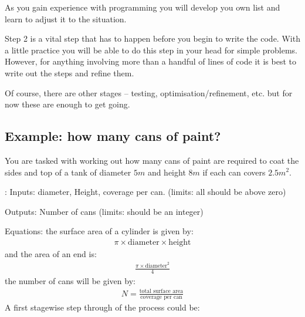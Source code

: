 \documentclass[letterpaper,10pt,english]{jupyterBook}
\begin{document}
\sphinxAtStartPar
As you gain experience with programming you will develop you own list and learn to adjust it to the situation.

\sphinxAtStartPar
Step 2 is a vital step that has to happen before you begin to write the code. With a little practice you will be able to do this step in your head for simple problems. However, for anything involving more than a handful of lines of code it is best to write out the steps and refine them.

\sphinxAtStartPar
Of course, there are other stages – testing, optimisation/refinement, etc. but for now these are enough to get going.


\subsection{Example: how many cans of paint?}
\label{\detokenize{ProgInPython:example-how-many-cans-of-paint}}
\sphinxAtStartPar
You are tasked with working out how many cans of paint are required to coat the sides and top of a tank of diameter \(5m\) and height \(8m\) if each can covers \(2.5m^2\).

\sphinxAtStartPar
{}:
Inputs: diameter, Height, coverage per can. (limits: all should be above zero)

\sphinxAtStartPar
Outputs: Number of cans (limits: should be an integer)

\sphinxAtStartPar
Equations:
the surface area of a cylinder is given by:
\begin{equation*}
\begin{split} \pi\times \textrm{diameter}\times \textrm{height}\end{split}
\end{equation*}
\sphinxAtStartPar
and the area of an end is:
\begin{equation*}
\begin{split} \frac{\pi\times \textrm{diameter}^2}{4}\end{split}
\end{equation*}
\sphinxAtStartPar
the number of cans will be given by:
\begin{equation*}
\begin{split}N=\frac{\textrm{total surface area}}{\textrm{coverage per can}}\end{split}
\end{equation*}
\sphinxAtStartPar
{}
A first stage\sphinxhyphen{}wise step through of the process could be:
\end{document}
